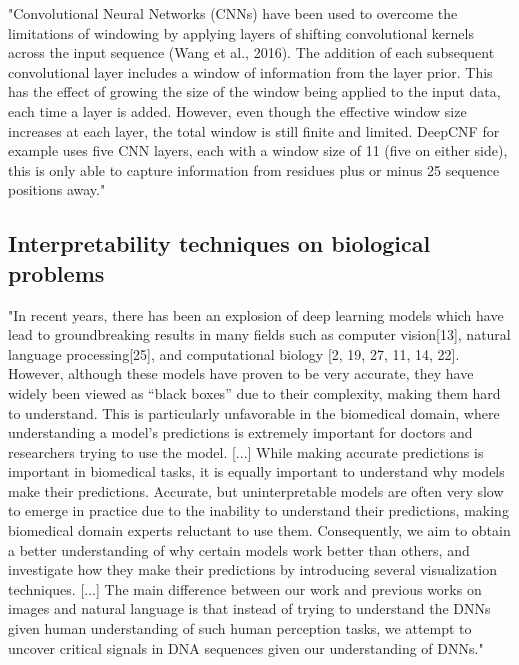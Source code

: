	"Convolutional Neural Networks (CNNs) have been used to overcome the limitations of windowing by applying layers of shifting convolutional kernels across the input sequence (Wang et al., 2016). The addition of each subsequent convolutional layer includes a window of information from the layer prior. This has the effect of growing the size of the window being applied to the input data, each time a layer is added. However, even though the effective window size increases at each layer, the total window is still finite and limited. DeepCNF for example uses five CNN layers, each with a window size of 11 (five on either side), this is only able to capture information from residues plus or minus 25 sequence positions away." \cite{Heffernan2017}

	\subsection{Interpretability techniques on biological problems}
	"In recent years, there has been an explosion of deep learning models which have lead to groundbreaking results in many fields such as computer vision[13], natural language processing[25], and computational biology [2, 19, 27, 11, 14, 22]. However, although these models have proven to be very accurate, they have widely been viewed as “black boxes” due to their complexity, making them hard to understand. This is particularly unfavorable in the biomedical domain, where understanding a model’s predictions is extremely important for doctors and researchers trying to use the model.
	 [...]
	While making accurate predictions is important in biomedical tasks, it is equally important to understand why models make their predictions. Accurate, but uninterpretable models are often very slow to emerge in practice due to the inability to understand their predictions, making biomedical domain experts reluctant to use them. Consequently, we aim to obtain a better understanding of why certain models work better than others, and investigate how they make their predictions by introducing several visualization techniques.
	[...]
	The main difference between our work and previous works on images and natural language is that instead of trying to understand the DNNs given human understanding of such human perception tasks, we attempt to uncover critical signals in DNA sequences given our understanding of DNNs." \cite{Lanchantin2016}
	

